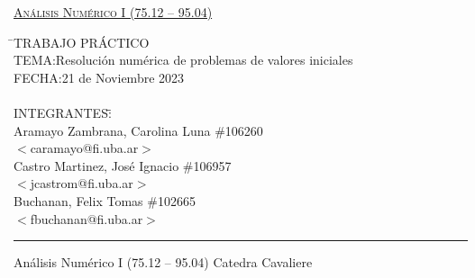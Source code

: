 \begin{titlepage}
    \vfill
    
    \begin{center}
    \Large{\underline{\textsc{Análisis Numérico I (75.12 – 95.04)}}}
    \end{center}
    
    \vfill
    
    \begin{tabbing}
    \hspace{2cm}\=\+TRABAJO PRÁCTICO\\
        TEMA:Resolución numérica de problemas de valores iniciales\\
        FECHA:21 de Noviembre 2023\\%
    \\
        INTEGRANTES:\hspace{-1cm}\=\+\hspace{1cm}\=\hspace{6cm}\=\\
            Aramayo Zambrana, Carolina Luna	\>\> \#106260\\
                \>\footnotesize{$<$caramayo@fi.uba.ar$>$}\\
            Castro Martinez, José Ignacio	\>\> \#106957\\
                \>\footnotesize{$<$jcastrom@fi.uba.ar$>$}\\
            Buchanan, Felix Tomas	\>\> \#102665\\
                \>\footnotesize{$<$fbuchanan@fi.uba.ar$>$}\\
    \end{tabbing}
    
    \vfill
    
    \hrule
    \vspace{0.2cm}
    
    \noindent\small{Análisis Numérico I (75.12 – 95.04) \hfill Catedra Cavaliere}
    
    \end{titlepage}